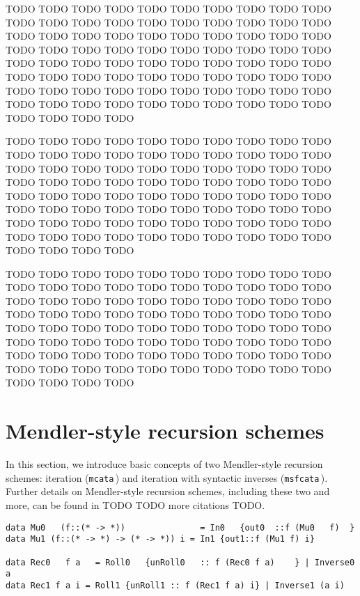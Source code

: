 \documentclass[a4paper,UKenglish]{lipics}
\begin{document}
TODO TODO TODO TODO TODO TODO TODO TODO TODO TODO TODO TODO
TODO TODO TODO TODO TODO TODO TODO TODO TODO TODO TODO TODO
TODO TODO TODO TODO TODO TODO TODO TODO TODO TODO TODO TODO
TODO TODO TODO TODO TODO TODO TODO TODO TODO TODO TODO TODO
TODO TODO TODO TODO TODO TODO TODO TODO TODO TODO TODO TODO
TODO TODO TODO TODO TODO TODO TODO TODO TODO TODO TODO TODO
TODO TODO TODO TODO TODO TODO TODO TODO TODO TODO TODO TODO

TODO TODO TODO TODO TODO TODO TODO TODO TODO TODO TODO TODO
TODO TODO TODO TODO TODO TODO TODO TODO TODO TODO TODO TODO
TODO TODO TODO TODO TODO TODO TODO TODO TODO TODO TODO TODO
TODO TODO TODO TODO TODO TODO TODO TODO TODO TODO TODO TODO
TODO TODO TODO TODO TODO TODO TODO TODO TODO TODO TODO TODO
TODO TODO TODO TODO TODO TODO TODO TODO TODO TODO TODO TODO
TODO TODO TODO TODO TODO TODO TODO TODO TODO TODO TODO TODO

TODO TODO TODO TODO TODO TODO TODO TODO TODO TODO TODO TODO
TODO TODO TODO TODO TODO TODO TODO TODO TODO TODO TODO TODO
TODO TODO TODO TODO TODO TODO TODO TODO TODO TODO TODO TODO
TODO TODO TODO TODO TODO TODO TODO TODO TODO TODO TODO TODO
TODO TODO TODO TODO TODO TODO TODO TODO TODO TODO TODO TODO
TODO TODO TODO TODO TODO TODO TODO TODO TODO TODO TODO TODO
TODO TODO TODO TODO TODO TODO TODO TODO TODO TODO TODO TODO


\section{Mendler-style recursion schemes}

In this section, we introduce basic concepts of two Mendler-style recursion
schemes: iteration (\lstinline{mcata}\,) and iteration with syntactic inverses
(\lstinline{msfcata}\,). Further details on Mendler-style recursion schemes,
including these two and more, can be found in \cite{AhnShe11} TODO TODO
more citations TODO.

\begin{lstlisting}[caption={TODO}]
data Mu0   (f::(* -> *))               = In0   {out0  ::f (Mu0   f)  }
data Mu1 (f::(* -> *) -> (* -> *)) i = In1 {out1::f (Mu1 f) i}
                                                              
data Rec0   f a   = Roll0   {unRoll0   :: f (Rec0 f a)    } | Inverse0   a
data Rec1 f a i = Roll1 {unRoll1 :: f (Rec1 f a) i} | Inverse1 (a i)
\end{lstlisting}
\end{document}
